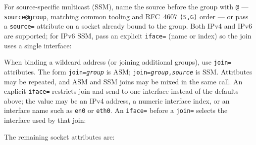 
For source-specific multicast (SSM), name the source before
the group with \texttt{@} --- \texttt{source@group}, matching common
tooling and RFC~4607 \texttt{(S,G)} order --- or pass a
\texttt{source=} attribute on a socket already bound to the group.
Both IPv4 and IPv6 are supported; for IPv6 SSM, pass an explicit
\texttt{iface=} (name or index) so the join uses a single interface:


When binding a wildcard address (or joining additional groups), use
\texttt{join=} attributes. The form \texttt{join=\textit{group}} is ASM;
\texttt{join=\textit{group},\textit{source}} is SSM. Attributes may be
repeated, and ASM and SSM joins may be mixed in the same call. An
explicit \texttt{iface=} restricts join and send to one interface
instead of the defaults above; the value may be an IPv4 address, a
numeric interface index, or an interface name such as \texttt{en0} or
\texttt{eth0}. An \texttt{iface=} before a \texttt{join=} selects the
interface used by that join:


The remaining socket attributes are:

